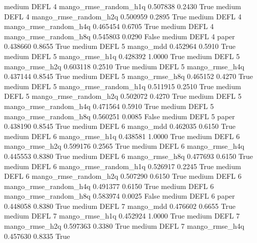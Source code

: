     medium     DEFL                 4 mango_rmse_random_h1q   0.507838      0.2430    True
    medium     DEFL                 4 mango_rmse_random_h2q   0.500959      0.2895    True
    medium     DEFL                 4 mango_rmse_random_h4q   0.465454      0.6705    True
    medium     DEFL                 4 mango_rmse_random_h8q   0.545803      0.0290   False
    medium     DEFL                 4                 paper   0.438660      0.8655    True
    medium     DEFL                 5             mango_mdd   0.452964      0.5910    True
    medium     DEFL                 5        mango_rmse_h1q   0.428392      1.0000    True
    medium     DEFL                 5        mango_rmse_h2q   0.603118      0.2510    True
    medium     DEFL                 5        mango_rmse_h4q   0.437144      0.8545    True
    medium     DEFL                 5        mango_rmse_h8q   0.465152      0.4270    True
    medium     DEFL                 5 mango_rmse_random_h1q   0.511915      0.2510    True
    medium     DEFL                 5 mango_rmse_random_h2q   0.502072      0.4270    True
    medium     DEFL                 5 mango_rmse_random_h4q   0.471564      0.5910    True
    medium     DEFL                 5 mango_rmse_random_h8q   0.560251      0.0085   False
    medium     DEFL                 5                 paper   0.438190      0.8545    True
    medium     DEFL                 6             mango_mdd   0.462035      0.6150    True
    medium     DEFL                 6        mango_rmse_h1q   0.438581      1.0000    True
    medium     DEFL                 6        mango_rmse_h2q   0.599176      0.2565    True
    medium     DEFL                 6        mango_rmse_h4q   0.445553      0.8380    True
    medium     DEFL                 6        mango_rmse_h8q   0.477693      0.6150    True
    medium     DEFL                 6 mango_rmse_random_h1q   0.526917      0.2245    True
    medium     DEFL                 6 mango_rmse_random_h2q   0.507290      0.6150    True
    medium     DEFL                 6 mango_rmse_random_h4q   0.491377      0.6150    True
    medium     DEFL                 6 mango_rmse_random_h8q   0.583974      0.0025   False
    medium     DEFL                 6                 paper   0.448058      0.8380    True
    medium     DEFL                 7             mango_mdd   0.476602      0.6655    True
    medium     DEFL                 7        mango_rmse_h1q   0.452924      1.0000    True
    medium     DEFL                 7        mango_rmse_h2q   0.597363      0.3380    True
    medium     DEFL                 7        mango_rmse_h4q   0.457630      0.8335    True
